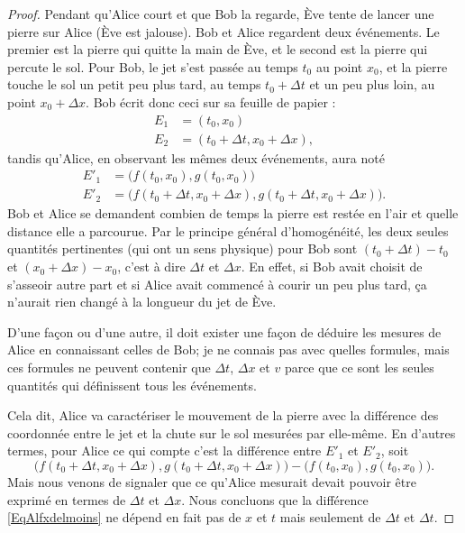 \begin{proof}
Pendant qu'Alice court et que Bob la regarde, Ève tente de lancer une pierre sur Alice (Ève est jalouse). Bob et Alice regardent deux événements. Le premier est la pierre qui quitte la main de Ève, et le second est la pierre qui percute le sol. Pour Bob, le jet s'est passée au temps $t_0$ au point $x_0$, et la pierre touche le sol un petit peu plus tard, au temps $t_0+\Delta t$ et un peu plus loin, au point $x_0+\Delta x$. Bob écrit donc ceci sur sa feuille de papier :
\[ 
\begin{split}
E_1&=(t_0,x_0)\\
E_2&=(t_0+\Delta t,x_0+\Delta x),
\end{split}  
\]
tandis qu'Alice, en observant les mêmes deux événements, aura noté
\[ 
\begin{split}
E'_1&=\big( f(t_0,x_0),g(t_0,x_0) \big) \\
E'_2&=\big( f(t_0+\Delta t,x_0+\Delta x), g(t_0+\Delta t,x_0+\Delta x) \big).
\end{split}  
\]
Bob et Alice se demandent combien de temps la pierre est restée en l'air et quelle distance elle a parcourue. Par le principe général d'homogénéité, les deux seules quantités pertinentes (qui ont un sens physique) pour Bob sont $(t_0+\Delta t)-t_0$ et $(x_0+\Delta x)-x_0$, c'est à dire $\Delta t$ et $\Delta x$. En effet, si Bob avait choisit de s'asseoir autre part et si Alice avait commencé à courir un peu plus tard, ça n'aurait rien changé à la longueur du jet de Ève.

D'une façon ou d'une autre, il doit exister une façon de déduire les mesures de Alice en connaissant celles de Bob; je ne connais pas avec quelles formules, mais ces formules ne peuvent contenir que $\Delta t$, $\Delta x$ et $v$ parce que ce sont les seules quantités qui définissent tous les événements.

Cela dit, Alice va caractériser le mouvement de la pierre avec la différence des coordonnée entre le jet et la chute sur le sol mesurées par elle-même. En d'autres termes, pour Alice ce qui compte c'est la différence entre $E'_1$ et $E'_2$, soit
\begin{equation}	\label{EqAlfxdelmoins}
   \big( f(t_0+\Delta t,x_0+\Delta x), g(t_0+\Delta t,x_0+\Delta x) \big)-\big( f(t_0,x_0),g(t_0,x_0) \big).
\end{equation} 
Mais nous venons de signaler que ce qu'Alice mesurait devait pouvoir être exprimé en termes de $\Delta t$ et $\Delta x$. Nous concluons que la différence \eqref{EqAlfxdelmoins} ne dépend en fait pas de $x$ et $t$ mais seulement de $\Delta t$ et $\Delta t$.


\end{proof}
